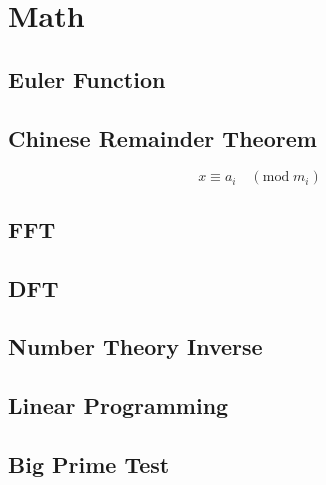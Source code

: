 \section{Math}

\subsection{Euler Function}


\subsection{Chinese Remainder Theorem}
\[
	x \equiv a_i \quad (\mathrm{mod}\;m_i)
\]


\subsection{FFT}


\subsection{DFT}

\subsection{Number Theory Inverse}


\subsection{Linear Programming}


\subsection{Big Prime Test}

